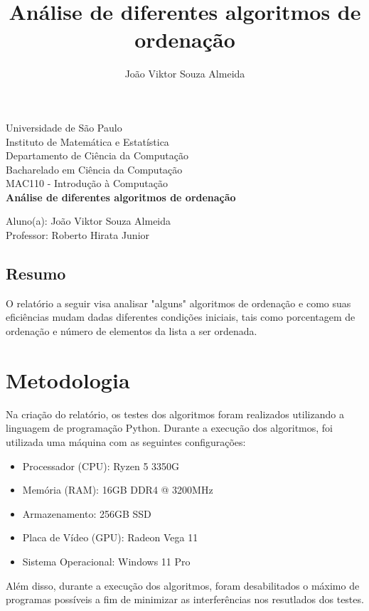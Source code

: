 \documentclass[10pt,a4paper]{article}
\author{João Viktor Souza Almeida}
\title{Análise de diferentes algoritmos de ordenação}
\begin{document}
\begin{titlepage} %
    \begin{center} %
    {\large Universidade de São Paulo}\\[0.2cm] %
    {\large Instituto de Matemática e Estatística}\\[0.2cm] %
    {\large Departamento de Ciência da Computação}\\[0.2cm]
    {\large Bacharelado em Ciência da Computação}\\[0.2cm]
    {\large MAC110 - Introdução à Computação}\\[5.1cm]
    {\bf \huge Análise de diferentes algoritmos de ordenação}\\[5.1cm] 
    \end{center} %
    {\large Aluno(a): João Viktor Souza Almeida}\\[0.7cm] %
    {\large Professor: Roberto Hirata Junior}\\[5.1cm]
    \end{titlepage} %

\subsection*{Resumo}
O relatório a seguir visa analisar "alguns" algoritmos de ordenação e como suas eficiências mudam dadas diferentes condições iniciais, tais como porcentagem de ordenação e número de elementos da lista a ser ordenada. 
\
\section*{Metodologia}
Na criação do relatório, os testes dos algoritmos foram realizados utilizando a linguagem de programação Python. Durante a execução dos algoritmos, foi utilizada uma máquina com as seguintes configurações:
\begin{itemize}
\item    Processador (CPU): Ryzen 5 3350G 
\item Memória (RAM): 16GB DDR4 @ 3200MHz
\item Armazenamento: 256GB SSD
\item Placa de Vídeo (GPU): Radeon Vega 11
\item Sistema Operacional: Windows 11 Pro
\end{itemize}
Além disso, durante a execução dos algoritmos, foram desabilitados o máximo de programas possíveis a fim de minimizar as interferências nos resutlados dos testes. 
\end{document}
